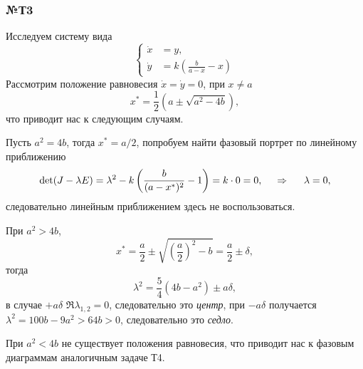 



\subsubsection*{№Т3}
Исследуем систему вида
\begin{equation*}
    \left\{\begin{aligned}
        \dot{x} &= y, \\
        \dot{y} &= k \left(
            \frac{b}{a-x} - x
        \right)
    \end{aligned}\right.
\end{equation*}
Рассмотрим положение равновесия $\dot{x} = \dot{y} = 0$, при $x \neq a$
\begin{equation*}
    x^* = \frac{1}{2}\left(
        a \pm \sqrt{a^2 - 4b}
    \right),
\end{equation*}
что приводит нас к следующим случаям. 

Пусть $a^2 = 4b$, тогда $x^* = a/2$, попробуем найти фазовый портрет по линейному приближению
\begin{equation*}
    \det(J - \lambda E) = 
     \lambda^2 - k\left(
        \frac{b}{(a-x^*)^2}-1
     \right) = k \cdot 0 = 0,
     \hspace{0.5cm} \Rightarrow \hspace{0.5cm}
     \lambda = 0,
\end{equation*}
следовательно линейным приближением здесь не воспользоваться.

При $a^2 > 4b$, 
\begin{equation*}
    x^* = \frac{a}{2} \pm \sqrt{
    \left(\frac{a}{2}\right)^2 - b
    } = \frac{a}{2} \pm \delta,
\end{equation*}
тогда
\begin{equation*}
    \lambda^2 = \frac{5}{4} (4b - a^2) \pm a \delta,
\end{equation*}
в случае $+ a\delta$ $\Re \lambda_{1, 2} = 0$, следовательно это \textit{центр}, при $-a \delta$ получается $\lambda^2 = 100 b - 9 a^2 > 64 b > 0$, следовательно это \textit{седло}.

При $a^2 < 4b$ не существует положения равновесия, что приводит нас к фазовым диаграммам аналогичным задаче Т4. 






